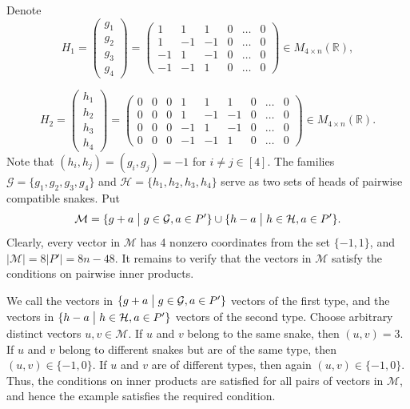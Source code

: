 \documentclass[12pt,a4paper]{article}
\newcommand{\M}{\mathcal{M}}
\begin{document}
Denote
$$
H_1 = \begin{pmatrix} g_1 \\ g_2 \\ g_3 \\ g_4 \end{pmatrix} =
\begin{pmatrix}
1 & 1 & 1 & 0 & \dots & 0 \\
1 & -1 & -1 & 0 & \dots & 0 \\
-1 & 1 & -1 & 0 & \dots & 0 \\
-1 & -1 & 1 & 0 & \dots & 0
\end{pmatrix} \in M_{4 \times n}(\mathbb R),
$$

$$
H_2 = \begin{pmatrix} h_1 \\ h_2 \\ h_3 \\ h_4 \end{pmatrix} =
\begin{pmatrix}
0 & 0 & 0 & 1 & 1 & 1 & 0 & \dots & 0 \\
0 & 0 & 0 & 1 & -1 & -1 & 0 & \dots & 0 \\
0 & 0 & 0 & -1 & 1 & -1 & 0 & \dots & 0 \\
0 & 0 & 0 & -1 & -1 & 1 & 0 & \dots & 0
\end{pmatrix} \in M_{4 \times n}(\mathbb R).
$$
Note that $(h_i,h_j) = (g_i, g_j) = -1$ for $i\not=j \in [4]$. The families $\mathcal G = \{g_1, g_2, g_3, g_4\}$ and $\mathcal H =  \{h_1, h_2, h_3, h_4\}$ serve as two sets of heads of pairwise compatible snakes. Put
$$
\M = \{g + a \bigm| g \in \mathcal G, a \in P'
\} \cup \{h - a \bigm| h \in \mathcal H, a \in P'
\}.
$$
Clearly, every vector in $\M$ has 4 nonzero coordinates from the set $\{-1,1\}$, and $|\M| = 8|P'| = 8n-48$. It remains to verify that the vectors in $\M$ satisfy the conditions on pairwise inner products.

We call the vectors in $\{g + a \bigm| g \in \mathcal G, a \in P'\}$ vectors of the first type, and the vectors in $\{h - a \bigm| h \in \mathcal H, a \in P'\}$ vectors of the second type. Choose arbitrary distinct vectors $u,v \in \M$. If $u$ and $v$ belong to the same snake, then $(u,v)=3$. If $u$ and $v$ belong to different snakes but are of the same type, then $(u,v) \in \{-1,0\}$. If $u$ and $v$ are of different types, then again $(u,v) \in \{-1,0\}$. Thus, the conditions on inner products are satisfied for all pairs of vectors in $\M$, and hence the example satisfies the required condition.
\end{document}

